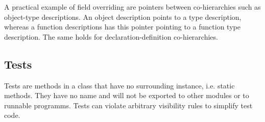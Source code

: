 A practical example of field overriding are pointers between co-hierarchies such as object-type descriptions.
An object description points to a type description, whereas a function descriptions has this pointer pointing to a function type description.
The same holds for declaration-definition co-hierarchies.


\subsection{Tests}

Tests are methods in a class that have no surrounding instance, i.e. static methods.
They have no name and will not be exported to other modules or to runnable programms.
Tests can violate arbitrary visibility rules to simplify test code.